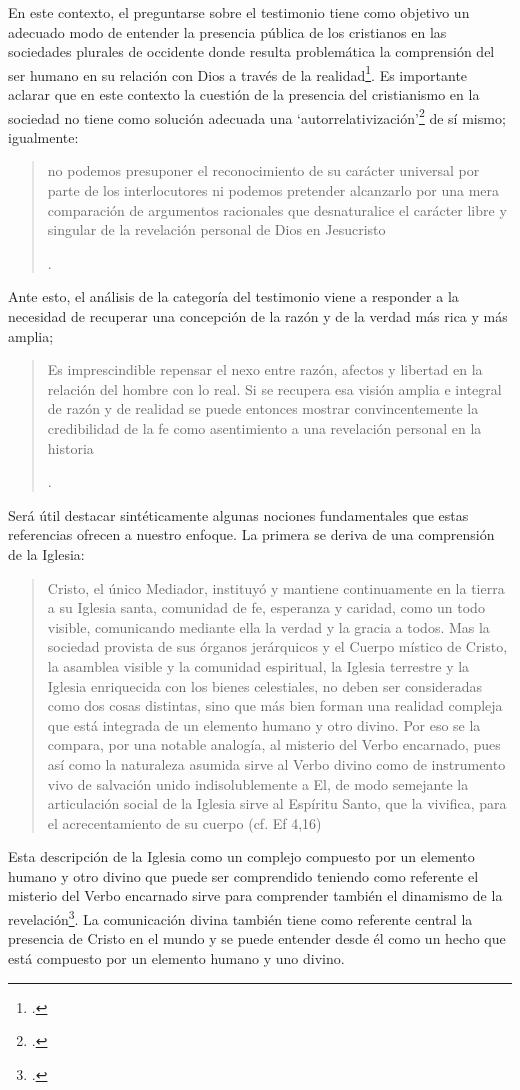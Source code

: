 En este contexto, el preguntarse sobre el testimonio tiene como objetivo un adecuado modo de entender la presencia pública de los cristianos en las sociedades plurales de occidente donde resulta problemática la comprensión del ser humano en su relación con Dios a través de la realidad\footcite[Cf.][75]{prades2015testimonio}. Es importante aclarar que en este contexto la cuestión de la presencia del cristianismo en la sociedad no tiene como solución adecuada una `autorrelativización'\footcite[Cf.][75;\,40-44]{prades2015testimonio} de sí mismo; igualmente: \blockquote[{\Cite[75; Cf. 33-40]{prades2015testimonio}}.]{no podemos presuponer el reconocimiento de su carácter universal por parte de los interlocutores ni podemos pretender alcanzarlo por una mera comparación de argumentos racionales que desnaturalice el carácter libre y singular de la revelación personal de Dios en Jesucristo}. Ante esto, el análisis de la categoría del testimonio viene a responder a la necesidad de recuperar una concepción de la razón y de la verdad más rica y más amplia; \blockquote[{\Cite[76]{prades2015testimonio}}.]{Es imprescindible repensar el nexo entre razón, afectos y libertad en la relación del hombre con lo real. Si se recupera esa visión amplia e integral de razón y de realidad se puede entonces mostrar convincentemente la credibilidad de la fe como asentimiento a una revelación personal en la historia}.
\label{subsec:amplia}

Será útil destacar sintéticamente algunas nociones fundamentales que estas referencias ofrecen a nuestro enfoque. La primera se deriva de una comprensión de la Iglesia: \blockquote[][\,(LG 8)]{Cristo, el único Mediador, instituyó y mantiene continuamente en la tierra a su Iglesia santa, comunidad de fe, esperanza y caridad, como un todo visible, comunicando mediante ella la verdad y la gracia a todos. Mas la sociedad provista de sus órganos jerárquicos y el Cuerpo místico de Cristo, la asamblea visible y la comunidad espiritual, la Iglesia terrestre y la Iglesia enriquecida con los bienes celestiales, no deben ser consideradas como dos cosas distintas, sino que más bien forman una realidad compleja que está integrada de un elemento humano y otro divino. Por eso se la compara, por una notable analogía, al misterio del Verbo encarnado, pues así como la naturaleza asumida sirve al Verbo divino como de instrumento vivo de salvación unido indisolublemente a El, de modo semejante la articulación social de la Iglesia sirve al Espíritu Santo, que la vivifica, para el acrecentamiento de su cuerpo (cf. Ef 4,16)}.
Esta descripción de la Iglesia como un complejo compuesto por un elemento humano y otro divino que puede ser comprendido teniendo como referente el misterio del Verbo encarnado sirve para comprender también el dinamismo de la revelación\footnote{\Cite[Cf.][480]{ninot2009tf}.}. La comunicación divina también tiene como referente central la presencia de Cristo en el mundo y se puede entender desde él como un hecho que está compuesto por un elemento humano y uno divino.

